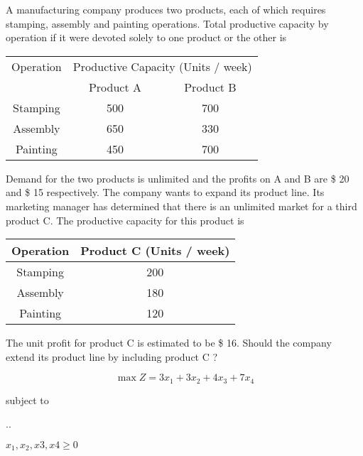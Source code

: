 \documentclass[../main.tex]{subfiles}
\begin{document}

\begin{questions}
\question %

A manufacturing company produces two products, each of which requires stamping, assembly and painting operations. Total productive capacity by operation if it were devoted solely to one product or the other is

{\centering
  \begin{tabular}{ccc}
    \toprule
    Operation& \multicolumn{2}{c}{Productive Capacity (Units / week)} \\
    \cmidrule{2-3}
             &Product A& Product B \\
    \midrule
    Stamping & 500 & 700\\
    Assembly & 650 & 330\\
    Painting & 450 & 700\\
       \bottomrule
  \end{tabular}
  \par}

Demand for the two products is unlimited and the profits on A and B are \$ 20 and \$ 15 respectively. The company wants to expand its product line. Its marketing manager has determined that there is an unlimited market for a third product C. The productive capacity for
this product is

{\centering
  \begin{tabular}{cc}
    \toprule
    Operation& Product C (Units / week) \\
    \midrule
    Stamping & 200 \\
    Assembly & 180 \\
    Painting & 120 \\
       \bottomrule
  \end{tabular}
  \par}

The unit profit for product C is estimated to be \$ 16. Should the company extend its product line by including product C ?


\begin{solution}{}
  \[\max Z = 3x_1 + 3x_2 + 4x_3 + 7x_4 \]

{\centering
subject to

\sysdelim..%
%

\vspace{3mm}
$x_1, x_2, x3, x4 \geq 0$
\par}

\end{solution}


\end{questions}
\end{document}
